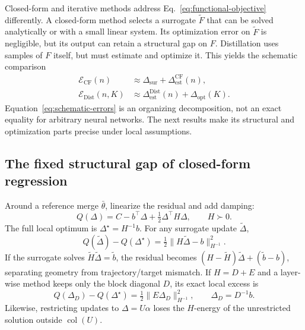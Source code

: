\documentclass[letterpaper]{article} %
\theoremstyle{plain}
\theoremstyle{definition}
\begin{document}
Closed-form and iterative methods address Eq.~\eqref{eq:functional-objective} differently.
A closed-form method selects a surrogate $\widetilde F$ that can be solved analytically or
with a small linear system. Its optimization error on $\widetilde F$ is negligible, but
its output can retain a structural gap on $F$. Distillation uses samples of $F$ itself,
but must estimate and optimize it. This yields the schematic comparison
\begin{equation}
\begin{aligned}
\mathcal E_{\mathrm{CF}}(n)
&\approx \Delta_{\mathrm{sur}}+\Delta_{\mathrm{est}}^{\mathrm{CF}}(n),\\
\mathcal E_{\mathrm{Dist}}(n,K)
&\approx \Delta_{\mathrm{est}}^{\mathrm{Dist}}(n)
+\Delta_{\mathrm{opt}}(K).
\end{aligned}
\label{eq:schematic-errors}
\end{equation}
Equation~\eqref{eq:schematic-errors} is an organizing decomposition, not an exact equality
for arbitrary neural networks. The next results make its structural and optimization parts
precise under local assumptions.

\subsection{The fixed structural gap of closed-form regression}
\label{sec:closed-form-gap}

Around a reference merge $\bar\theta$, linearize the residual and add damping:
\begin{equation}
Q(\Delta)=C-b^\top\Delta+\tfrac12\Delta^\top H\Delta,
\qquad H\succ0.
\label{eq:local-quadratic}
\end{equation}
The full local optimum is $\Delta^\star=H^{-1}b$. For any surrogate update
$\widetilde\Delta$,
\begin{equation}
Q(\widetilde\Delta)-Q(\Delta^\star)
=\tfrac12\|H\widetilde\Delta-b\|_{H^{-1}}^2.
\label{eq:gap-main}
\end{equation}
If the surrogate solves $\widetilde H\widetilde\Delta=\widetilde b$, the residual becomes
$(H-\widetilde H)\widetilde\Delta+(\widetilde b-b)$, separating geometry from
trajectory/target mismatch. If $H=D+E$ and a layer-wise method keeps only the block
diagonal $D$, its exact local excess is
\begin{equation}
Q(\Delta_D)-Q(\Delta^\star)
=\tfrac12\|E\Delta_D\|_{H^{-1}}^2,
\qquad \Delta_D=D^{-1}b.
\label{eq:cross-layer-gap-main}
\end{equation}
Likewise, restricting updates to $\Delta=U\alpha$ loses the $H$-energy of the unrestricted
solution outside $\operatorname{col}(U)$.
\end{document}
